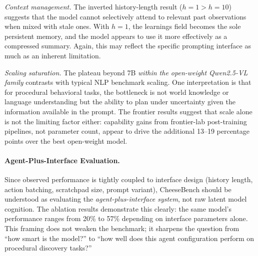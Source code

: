 \documentclass[letterpaper]{article}
\begin{document}
\emph{Context management.}
The inverted history-length result ($h{=}1 > h{=}10$) suggests that the model cannot selectively attend to relevant past observations when mixed with stale ones.
With $h{=}1$, the learnings field becomes the sole persistent memory, and the model appears to use it more effectively as a compressed summary.
Again, this may reflect the specific prompting interface as much as an inherent limitation.

\emph{Scaling saturation.}
The plateau beyond 7B \emph{within the open-weight Qwen2.5-VL family} contrasts with typical NLP benchmark scaling.
One interpretation is that for procedural behavioral tasks, the bottleneck is not world knowledge or language understanding but the ability to plan under uncertainty given the information available in the prompt.
The frontier results suggest that scale alone is not the limiting factor either: capability gains from frontier-lab post-training pipelines, not parameter count, appear to drive the additional 13--19 percentage points over the best open-weight model.

\paragraph{Agent-Plus-Interface Evaluation.}
Since observed performance is tightly coupled to interface design (history length, action batching, scratchpad size, prompt variant), CheeseBench should be understood as evaluating the \emph{agent-plus-interface system}, not raw latent model cognition.
The ablation results demonstrate this clearly: the same model's performance ranges from 20\% to 57\% depending on interface parameters alone.
This framing does not weaken the benchmark; it sharpens the question from ``how smart is the model?'' to ``how well does this agent configuration perform on procedural discovery tasks?''
\end{document}
